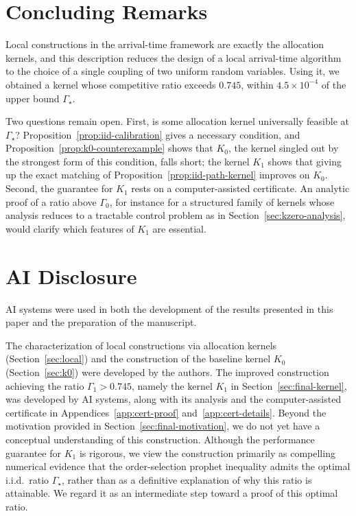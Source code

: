 \documentclass[11pt]{article}
\theoremstyle{definition}
\theoremstyle{remark}
\begin{document}
\section{Concluding Remarks}\label{sec:conclusion}

Local constructions in the arrival-time framework are exactly the allocation kernels, and this
description reduces the design of a local arrival-time algorithm to the choice of a single
coupling of two uniform random variables. Using it, we obtained a kernel whose competitive
ratio exceeds $0.745$, within $4.5\times10^{-4}$ of the upper bound $\Gamma_\star$.

Two questions remain open. First, is some allocation kernel universally feasible at
$\Gamma_\star$? Proposition~\ref{prop:iid-calibration} gives a necessary condition, and
Proposition~\ref{prop:k0-counterexample} shows that $K_0$, the kernel singled out by the
strongest form of this condition, falls short; the kernel $K_1$ shows that giving up the
exact matching of Proposition~\ref{prop:iid-path-kernel} improves on $K_0$. Second, the guarantee for $K_1$ rests on a
computer-assisted certificate. An analytic proof of a ratio above $\Gamma_0$, for instance
for a structured family of kernels whose analysis reduces to a tractable control problem as
in Section~\ref{sec:kzero-analysis}, would clarify which features of $K_1$ are essential.

\section*{AI Disclosure}

AI systems were used in both the development of the results presented in this paper and the preparation of the manuscript.

The characterization of local constructions via allocation kernels (Section~\ref{sec:local}) and the construction of the baseline kernel $K_0$ (Section~\ref{sec:k0}) were developed by the authors. The improved construction achieving the ratio $\Gamma_1>0.745$, namely the kernel $K_1$ in Section~\ref{sec:final-kernel}, was developed by AI systems, along with its analysis and the computer-assisted certificate in Appendices~\ref{app:cert-proof} and~\ref{app:cert-details}. Beyond the motivation provided in Section~\ref{sec:final-motivation}, we do not yet have a conceptual understanding of this construction. Although the performance guarantee for $K_1$ is rigorous, we view the construction primarily as compelling numerical evidence that the order-selection prophet inequality admits the optimal i.i.d.\ ratio $\Gamma_\star$, rather than as a definitive explanation of why this ratio is attainable. We regard it as an intermediate step toward a proof of this optimal ratio.
\end{document}
